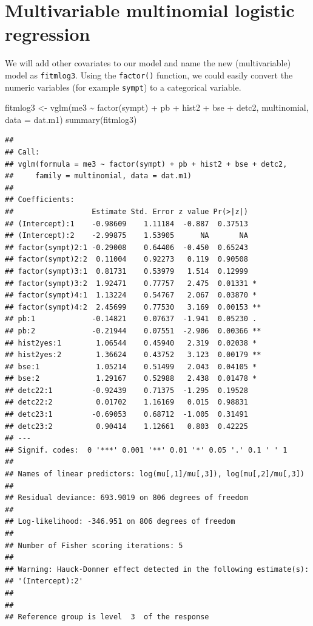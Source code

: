 \documentclass[
  10pt,
]{krantz}
\newenvironment{Shaded}{\begin{snugshade}}{\end{snugshade}}
\newcommand{\AttributeTok}[1]{\textcolor[rgb]{0.77,0.63,0.00}{#1}}
\newcommand{\FunctionTok}[1]{\textcolor[rgb]{0.00,0.00,0.00}{#1}}
\newcommand{\NormalTok}[1]{#1}
\newcommand{\OtherTok}[1]{\textcolor[rgb]{0.56,0.35,0.01}{#1}}
\newcommand{\SpecialCharTok}[1]{\textcolor[rgb]{0.00,0.00,0.00}{#1}}
\begin{document}
\hypertarget{multivariable-multinomial-logistic-regression}{%
\section{\texorpdfstring{Multivariable multinomial logistic regression}{Multivariable multinomial logistic regression}}\label{multivariable-multinomial-logistic-regression}}

We will add other covariates to our model and name the new (multivariable) model as \texttt{fitmlog3}. Using the \texttt{factor()} function, we could easily convert the numeric variables (for example \texttt{sympt}) to a categorical variable.

\begin{Shaded}
\begin{Highlighting}[]
\NormalTok{fitmlog3 }\OtherTok{\textless{}{-}} \FunctionTok{vglm}\NormalTok{(me3 }\SpecialCharTok{\textasciitilde{}} \FunctionTok{factor}\NormalTok{(sympt) }\SpecialCharTok{+}\NormalTok{ pb }\SpecialCharTok{+}\NormalTok{ hist2 }\SpecialCharTok{+}\NormalTok{ bse }\SpecialCharTok{+}\NormalTok{ detc2,}
\NormalTok{                 multinomial, }\AttributeTok{data =}\NormalTok{ dat.m1)}
\FunctionTok{summary}\NormalTok{(fitmlog3)}
\end{Highlighting}
\end{Shaded}

\begin{verbatim}
## 
## Call:
## vglm(formula = me3 ~ factor(sympt) + pb + hist2 + bse + detc2, 
##     family = multinomial, data = dat.m1)
## 
## Coefficients: 
##                  Estimate Std. Error z value Pr(>|z|)   
## (Intercept):1    -0.98609    1.11184  -0.887  0.37513   
## (Intercept):2    -2.99875    1.53905      NA       NA   
## factor(sympt)2:1 -0.29008    0.64406  -0.450  0.65243   
## factor(sympt)2:2  0.11004    0.92273   0.119  0.90508   
## factor(sympt)3:1  0.81731    0.53979   1.514  0.12999   
## factor(sympt)3:2  1.92471    0.77757   2.475  0.01331 * 
## factor(sympt)4:1  1.13224    0.54767   2.067  0.03870 * 
## factor(sympt)4:2  2.45699    0.77530   3.169  0.00153 **
## pb:1             -0.14821    0.07637  -1.941  0.05230 . 
## pb:2             -0.21944    0.07551  -2.906  0.00366 **
## hist2yes:1        1.06544    0.45940   2.319  0.02038 * 
## hist2yes:2        1.36624    0.43752   3.123  0.00179 **
## bse:1             1.05214    0.51499   2.043  0.04105 * 
## bse:2             1.29167    0.52988   2.438  0.01478 * 
## detc22:1         -0.92439    0.71375  -1.295  0.19528   
## detc22:2          0.01702    1.16169   0.015  0.98831   
## detc23:1         -0.69053    0.68712  -1.005  0.31491   
## detc23:2          0.90414    1.12661   0.803  0.42225   
## ---
## Signif. codes:  0 '***' 0.001 '**' 0.01 '*' 0.05 '.' 0.1 ' ' 1
## 
## Names of linear predictors: log(mu[,1]/mu[,3]), log(mu[,2]/mu[,3])
## 
## Residual deviance: 693.9019 on 806 degrees of freedom
## 
## Log-likelihood: -346.951 on 806 degrees of freedom
## 
## Number of Fisher scoring iterations: 5 
## 
## Warning: Hauck-Donner effect detected in the following estimate(s):
## '(Intercept):2'
## 
## 
## Reference group is level  3  of the response
\end{verbatim}
\end{document}
